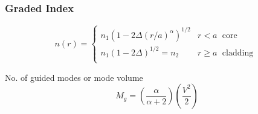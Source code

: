 \documentclass[12pt, onecolumn]{article}
\begin{document}
        \subsubsection{Graded Index}
            \begin{equation}
                n(r) = 
                \begin{cases}
                    n_1(1-2\Delta(r/a)^\alpha)^{1/2} & r < a \; \text{ core } \\
                    n_1(1-2\Delta)^{1/2} = n_2 & r \ge a \; \text{ cladding } \\                    
                \end{cases}
                \label{eq:graded_index}
            \end{equation}
            
            No. of guided modes or mode volume
            \begin{equation}
                M_g = \left(\frac{\alpha}{\alpha + 2}\right)\left(\frac{V^2}{2}\right)
                \label{eq:mode_vol_g}
            \end{equation}
\end{document}
